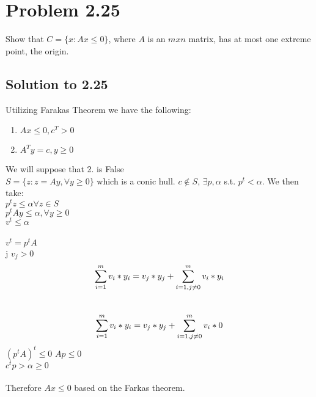 \documentclass[12pt]{article}
\begin{document}
\section{Problem 2.25}
Show that $C=\{x: Ax \leq 0\}$, where $A$ is an $m x n$ matrix, has at most one extreme point, the origin.\\
\subsection{Solution to 2.25}
Utilizing Farakas Theorem we have the following: 
\begin{enumerate}
    \item $Ax \leq 0, c^T > 0 $
    \item $A^T y = c, y \geq 0 $
\end{enumerate}
We will suppose that 2. is False \Rightarrow {}\\ 
$S = \{ z: z = Ay, \forall y \geq 0 \}$ which is a conic hull. 
\rightarrow $c \notin S$, $\exists p, \alpha$ s.t. $p^t < \alpha$.
We then take:\\
\quad \quad \quad \quad $p^tz \leq \alpha \forall z \in S$\\
\quad \quad \quad \quad $p^tAy \leq \alpha, \forall y \geq 0$\\
\quad \quad \quad \quad $v^t \leq \alpha$\\
\Rightarrow \alpha {}\\
\quad \quad \quad \quad $v^t = p^tA$\\
\quad \quad \quad \quad \exists j $v_j > 0$\\
\begin{equation*}
    \sum_{i=1}^{m} v_i* y_i = v_j*y_j + \sum_{i=1, j \neq 0}^{m}v_i* y_i\\
\end{equation*}
\Leftrightarrow \\
\begin{equation*}
    \sum_{i=1}^{m} v_i* y_i = v_j*y_j + \sum_{i=1, j \neq 0}^{m}v_i* 0\\
\end{equation*}
$(p^tA)^t \leq 0$ \leftrightarrow $Ap \leq 0$\\
$c^tp > \alpha \geq 0$\\ \\
Therefore $Ax \leq 0$ based on the Farkas theorem.\\ \\
\end{document}
